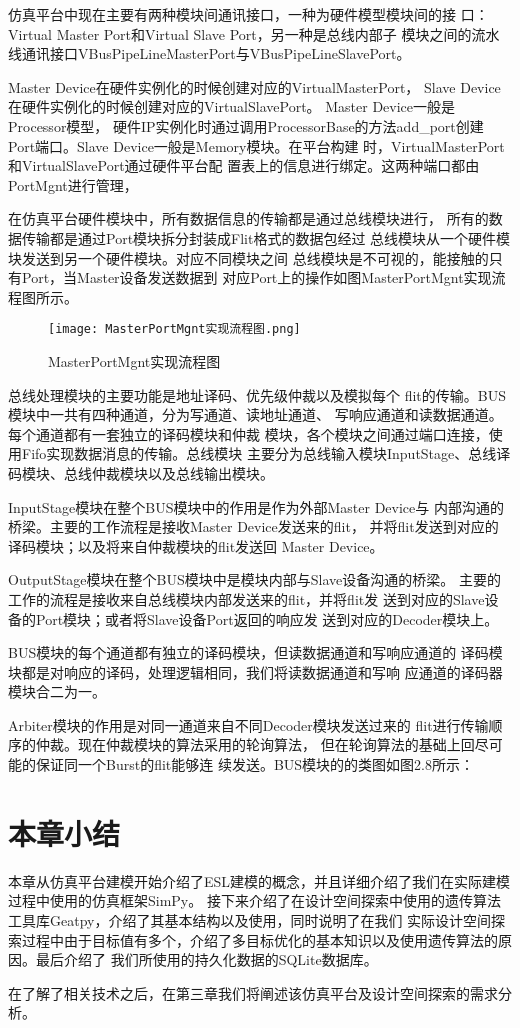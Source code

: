 仿真平台中现在主要有两种模块间通讯接口，一种为硬件模型模块间的接
口：Virtual Master Port和Virtual Slave Port，另一种是总线内部子
模块之间的流水线通讯接口VBusPipeLineMasterPort与VBusPipeLineSlavePort。

Master Device在硬件实例化的时候创建对应的VirtualMasterPort，
Slave Device在硬件实例化的时候创建对应的VirtualSlavePort。
Master Device一般是Processor模型，
硬件IP实例化时通过调用ProcessorBase的方法add\_port创建
Port端口。Slave Device一般是Memory模块。在平台构建
时，VirtualMasterPort和VirtualSlavePort通过硬件平台配
置表上的信息进行绑定。这两种端口都由PortMgnt进行管理，

在仿真平台硬件模块中，所有数据信息的传输都是通过总线模块进行，
所有的数据传输都是通过Port模块拆分封装成Flit格式的数据包经过
总线模块从一个硬件模块发送到另一个硬件模块。对应不同模块之间
总线模块是不可视的，能接触的只有Port，当Master设备发送数据到
对应Port上的操作如图MasterPortMgnt实现流程图所示。

\begin{figure}
  \centering
  \texttt{[image: MasterPortMgnt实现流程图.png]}
  \caption{MasterPortMgnt实现流程图}
  \label{fig:badge}
\end{figure}

总线处理模块的主要功能是地址译码、优先级仲裁以及模拟每个
flit的传输。BUS模块中一共有四种通道，分为写通道、读地址通道、
写响应通道和读数据通道。每个通道都有一套独立的译码模块和仲裁
模块，各个模块之间通过端口连接，使用Fifo实现数据消息的传输。总线模块
主要分为总线输入模块InputStage、总线译码模块、总线仲裁模块以及总线输出模块。

InputStage模块在整个BUS模块中的作用是作为外部Master Device与
内部沟通的桥梁。主要的工作流程是接收Master Device发送来的flit，
并将flit发送到对应的译码模块；以及将来自仲裁模块的flit发送回
Master Device。

OutputStage模块在整个BUS模块中是模块内部与Slave设备沟通的桥梁。
主要的工作的流程是接收来自总线模块内部发送来的flit，并将flit发
送到对应的Slave设备的Port模块；或者将Slave设备Port返回的响应发
送到对应的Decoder模块上。

BUS模块的每个通道都有独立的译码模块，但读数据通道和写响应通道的
译码模块都是对响应的译码，处理逻辑相同，我们将读数据通道和写响
应通道的译码器模块合二为一。

Arbiter模块的作用是对同一通道来自不同Decoder模块发送过来的
flit进行传输顺序的仲裁。现在仲裁模块的算法采用的轮询算法，
但在轮询算法的基础上回尽可能的保证同一个Burst的flit能够连
续发送。BUS模块的的类图如图2.8所示：

  \section{本章小结}
  本章从仿真平台建模开始介绍了ESL建模的概念，并且详细介绍了我们在实际建模过程中使用的仿真框架SimPy。
  接下来介绍了在设计空间探索中使用的遗传算法工具库Geatpy，介绍了其基本结构以及使用，同时说明了在我们
  实际设计空间探索过程中由于目标值有多个，介绍了多目标优化的基本知识以及使用遗传算法的原因。最后介绍了
  我们所使用的持久化数据的SQLite数据库。

  在了解了相关技术之后，在第三章我们将阐述该仿真平台及设计空间探索的需求分析。


  

